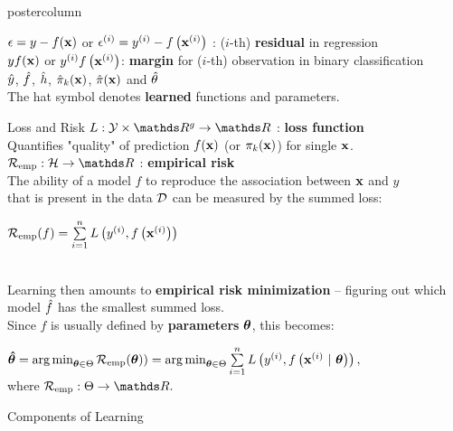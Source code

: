 \documentclass{beamer}
\begin{document}
\begin{frame}[fragile]{}
\begin{columns}
\begin{column}{.31\textwidth}
\begin{beamercolorbox}[center]{postercolumn}
\begin{minipage}{.98\textwidth}
{\begin{myblock}{}
$\epsilon = y - f(\mathbf{x})$ or $\epsilon^{(i)} = y^{(i)} - f\left(\mathbf{x}^{(i)}\right)$ : ($i$-th) \textbf{residual} in regression\\

$y f(\mathbf{x})$ or $y^{(i)} f\left(\mathbf{x}^{(i)}\right)$: \textbf{margin} for ($i$-th) observation in binary classification\\%

$\hat{y}$, $\hat{f}$, $\hat{h}$, $\hat \pi_{k}(\mathbf{x})$, $\hat \pi(\mathbf{x})$ and $\hat{\theta}$ \\
The hat symbol denotes \textbf{learned} functions and parameters.
\end{myblock}
\begin{myblock}{Loss and Risk}
  $L: \Yspace \times \R^g \to \R$ : \textbf{loss function} \\
 Quantifies "quality" of prediction $f(\mathbf{x})$ (or $\pi_{k}(\mathbf{x})$) for single $\mathbf{x}$. \\
  
  $\riske:  \Hspace \to \R $ : \textbf{empirical risk } \\
The ability of a model $f$ to reproduce the association between $\mathbf{x}$ and $y$ \\
that is present in the data $\mathcal{D}$ can be measured by the summed loss:
  
\begin{center}
  $\mathcal{R}_{\text{emp}}(f) = \sum\limits_{i=1}^n L\left(y^{(i)}, f\left(\mathbf{x}^{(i)}\right)\right)$ 
\end{center}  
\\
  
Learning then amounts to \textbf{empirical risk minimization} -- figuring out which model $\hat{f}$ has the smallest summed loss. \\ 
Since $f$ is usually defined by \textbf{parameters} $\bm{\theta}$, this becomes:

\begin{center}
$\bm{\hat\theta} = \operatorname{arg\,min}_{\bm{\theta} \in \Theta} \mathcal{R}_{\text{emp}}(\bm{\theta})) = \operatorname{arg\,min}_{\bm{\theta} \in \Theta} \sum\limits_{i=1}^n L\left(y^{(i)}, f\left(\mathbf{x}^{(i)} ~|~ \bm{\theta}\right)\right),$ \\
where $\riske : \Theta \to \R.$
\end{center}

\end{myblock}
\begin{myblock}{Components of Learning}


\end{myblock}}
\end{minipage}
\end{beamercolorbox}
\end{column}
\end{columns}
\end{frame}
\end{document}
